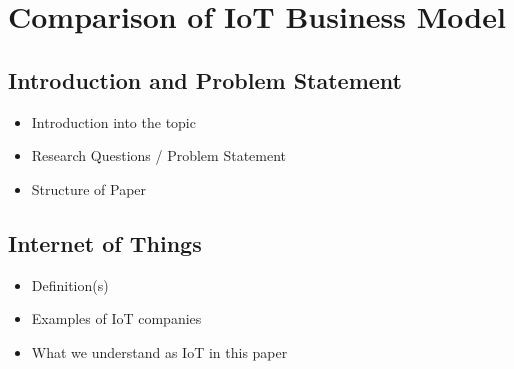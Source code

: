 
\chapter{Comparison of IoT Business Model}


\newpage

\minitoc %

\newpage
\renewcommand{\labelitemii}{$\diamond$}
\renewcommand{\labelitemiii}{$\circ$}
\section{Introduction and Problem Statement}
	\begin{itemize}
		\item Introduction into the topic
		\item Research Questions / Problem Statement
		\item Structure of Paper
	\end{itemize}

\section{Internet of Things}
	\begin{itemize}
		\item Definition(s) \cite{ju}
		\item Examples of IoT companies
		\item What we understand as IoT in this paper
	\end{itemize}

